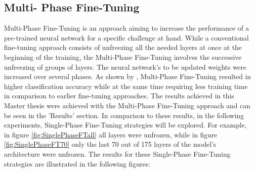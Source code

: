 \subsection{Multi- Phase Fine-Tuning}
Multi-Phase Fine-Tuning is an approach aiming to increase the performance of a pre-trained neural network for a specific challenge at hand. While a conventional fine-tuning approach consists of unfreezing all the needed layers at once at the beginning of the training, the Multi-Phase Fine-Tuning involves the successive unfreezing of groups of layers. The neural network's to be updated weights were increased over several phases. As shown by \citet{Sarhan:2020:MultiPhaseFineTuning}, Multi-Phase Fine-Tuning resulted in higher classification accuracy while at the same time requiring less training time in comparison to earlier fine-tuning approaches.
\newline\newline
The results achieved in this Master thesis were achieved with the Multi-Phase Fine-Tuning approach and can be seen in the 'Results' section. In comparison to these results, in the following experiments, Single-Phase Fine-Tuning strategies will be explored. For example, in figure \ref{fig:SinglePhaseFTall} all layers were unfrozen, while in figure \ref{fig:SinglePhaseFT70} only the last 70 out of 175 layers of the model's architecture were unfrozen. The results for these Single-Phase Fine-Tuning strategies are illustrated in the following figures:


